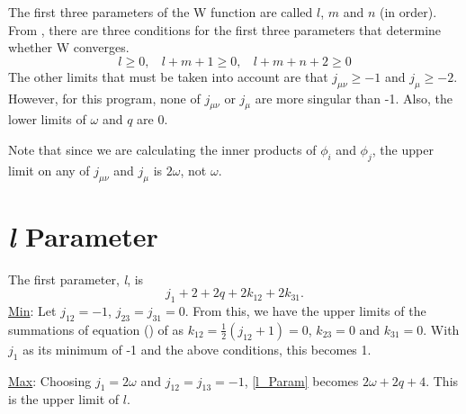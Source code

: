 \documentclass[Dissertation.tex]{subfiles}
\begin{document}
The first three parameters of the W function are called $l$, $m$ and $n$
(in order). From \cite{Drake1995}, there are three conditions for the first
three parameters that determine whether W converges.
\[l \geq 0, ~~~~ l+m+1 \geq 0, ~~~~ l+m+n+2 \geq 0\]
The other limits that must be taken into account are that $j_{\mu \nu} \geq -1$
and $j_{\mu} \geq -2$. However, for this program, none of $j_{\mu \nu}$ or
$j_{\mu}$ are more singular than -1.  Also, the lower limits of $\omega$ and
$q$ are 0.

Note that since we are calculating the inner products of $\phi_i$ and $\phi_j$,
the upper limit on any of $j_{\mu \nu}$ and $j_{\mu}$ is $2\omega$, not
$\omega$.

\section{\emph{l} Parameter}
The first parameter, \emph{l}, is
\begin{equation}
	\label{l_Param}j_1 + 2 + 2q + 2 k_{12} + 2 k_{31}.
\end{equation}
\underline{Min}: Let $j_{12} = -1$, $j_{23} = j_{31} = 0$.  From this, we 
have the upper limits of the summations of equation () of \cite{Drake1995} as 
$k_{12} = \tfrac{1}{2} (j_{12} + 1) = 0$, $k_{23} = 0$ and $k_{31} = 0$. With 
$j_1$ as its minimum of -1 and the above conditions, this becomes 1.

\noindent\underline{Max}: Choosing $j_1 = 2 \omega$ and $j_{12} = j_{13} = -1$, \cref{l_Param} becomes $2 \omega + 2q + 4$.  This is the upper limit of $l$.
\end{document}
